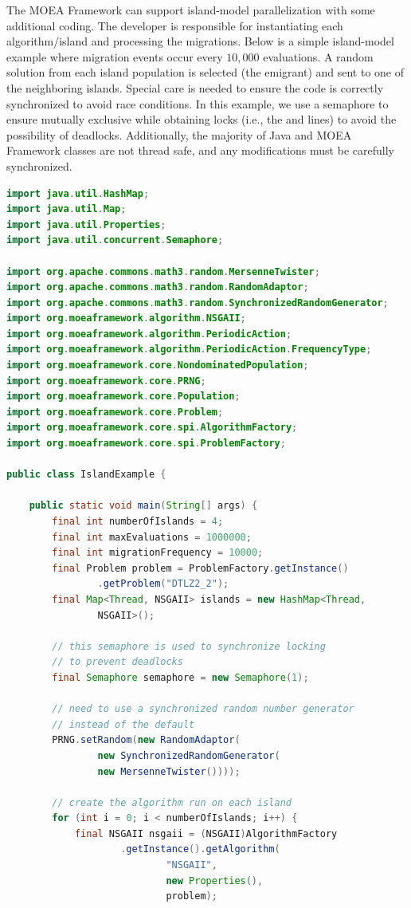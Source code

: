 {The MOEA Framework can support island-model parallelization with some additional coding.  The developer is responsible for instantiating each algorithm/island and processing the migrations.  Below is a simple island-model example where migration events occur every $10,000$ evaluations.  A random solution from each island population is selected (the emigrant) and sent to one of the neighboring islands.  Special care is needed to ensure the code is correctly synchronized to avoid race conditions.  In this example, we use a semaphore to ensure mutually exclusive while obtaining locks (i.e., the  and  lines) to avoid the possibility of deadlocks.  Additionally, the majority of Java and MOEA Framework classes are not thread safe, and any modifications must be carefully synchronized.

\begin{lstlisting}[language=Java]
import java.util.HashMap;
import java.util.Map;
import java.util.Properties;
import java.util.concurrent.Semaphore;

import org.apache.commons.math3.random.MersenneTwister;
import org.apache.commons.math3.random.RandomAdaptor;
import org.apache.commons.math3.random.SynchronizedRandomGenerator;
import org.moeaframework.algorithm.NSGAII;
import org.moeaframework.algorithm.PeriodicAction;
import org.moeaframework.algorithm.PeriodicAction.FrequencyType;
import org.moeaframework.core.NondominatedPopulation;
import org.moeaframework.core.PRNG;
import org.moeaframework.core.Population;
import org.moeaframework.core.Problem;
import org.moeaframework.core.spi.AlgorithmFactory;
import org.moeaframework.core.spi.ProblemFactory;

public class IslandExample {
	
	public static void main(String[] args) {
		final int numberOfIslands = 4;
		final int maxEvaluations = 1000000;
		final int migrationFrequency = 10000;
		final Problem problem = ProblemFactory.getInstance()
				.getProblem("DTLZ2_2");
		final Map<Thread, NSGAII> islands = new HashMap<Thread,
				NSGAII>();
		
		// this semaphore is used to synchronize locking
		// to prevent deadlocks
		final Semaphore semaphore = new Semaphore(1);
		
		// need to use a synchronized random number generator
		// instead of the default
		PRNG.setRandom(new RandomAdaptor(
				new SynchronizedRandomGenerator(
				new MersenneTwister())));
		
		// create the algorithm run on each island
		for (int i = 0; i < numberOfIslands; i++) {
			final NSGAII nsgaii = (NSGAII)AlgorithmFactory
					.getInstance().getAlgorithm(
							"NSGAII",
							new Properties(),
							problem);
			

\end{lstlisting}}
